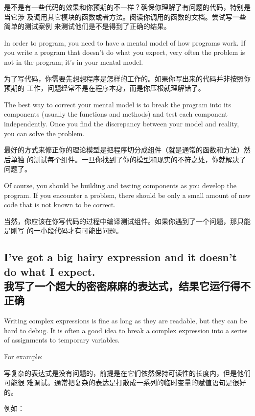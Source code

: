 \documentclass[10pt]{book}
\begin{document}
\begin{CJK}{UTF8}{gbsn}
\begin{itemize}
是不是有一些代码的效果和你预期的不一样？确保你理解了有问题的代码，特别是当它涉
及调用其它模块的函数或者方法。阅读你调用的函数的文档。尝试写一些简单的测试案例
来测试他们是不是得到了正确的结果。

\end{itemize}

In order to program, you need to have a mental model of how
programs work.  If you write a program that doesn't do what you expect,
very often the problem is not in the program; it's in your mental
model.

为了写代码，你需要先想想程序是怎样的工作的。如果你写出来的代码并非按照你预期的
工作，问题经常不是在程序本身，而是你压根就理解错了。

The best way to correct your mental model is to break the program
into its components (usually the functions and methods) and test
each component independently.  Once you find the discrepancy
between your model and reality, you can solve the problem.

最好的方式来修正你的理论模型是把程序切分成组件（就是通常的函数和方法）然后单独
的测试每个组件。一旦你找到了你的模型和现实的不符之处，你就解决了问题了。

Of course, you should be building and testing components as you
develop the program.  If you encounter a problem,
there should be only a small amount of new code
that is not known to be correct.

当然，你应该在你写代码的过程中编译测试组件。如果你遇到了一个问题，那只能是刚写
的一小段代码才有可能出问题。

\subsection{I've got a big hairy expression and it doesn't
do what I expect.
\\我写了一个超大的密密麻麻的表达式，结果它运行得不正确}

Writing complex expressions is fine as long as they are readable,
but they can be hard to debug.  It is often a good idea to
break a complex expression into a series of assignments to
temporary variables.

For example:

写复杂的表达式是没有问题的，前提是在它们依然保持可读性的长度内，但是他们可能很
难调试。通常把复杂的表达是打散成一系列的临时变量的赋值语句是很好的。

例如：


\end{CJK}
\end{document}
